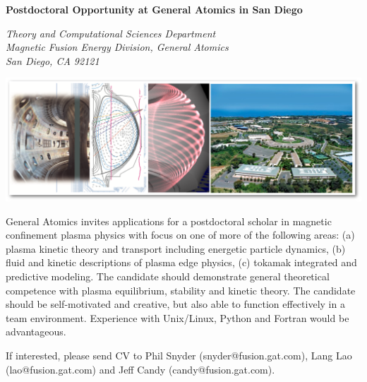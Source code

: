\documentclass[11pt,twoside]{article}
\begin{document}
\thispagestyle{empty}

\begin{center}
\textbf{\LARGE Postdoctoral Opportunity at General Atomics in San Diego} 
\end{center}

\begin{center}
  \textsl{Theory and Computational Sciences Department \\
    Magnetic Fusion Energy Division, General Atomics\\
    San Diego, CA 92121}
  \end{center}

\includegraphics[width=6.8in]{add.png}

General Atomics invites applications for a postdoctoral scholar in magnetic
confinement plasma physics with focus on one of more of the following areas:
(a) plasma kinetic theory and transport including energetic particle dynamics,
(b) fluid and kinetic descriptions of plasma edge physics,
(c) tokamak integrated and predictive modeling.
The candidate should demonstrate general theoretical competence with plasma
equilibrium, stability and kinetic theory.  The candidate should be self-motivated
and creative, but also able to function effectively in a team environment.
Experience with Unix/Linux, Python and Fortran would be advantageous.

If interested, please send CV to Phil Snyder (snyder@fusion.gat.com),
Lang Lao (lao@fusion.gat.com) and Jeff Candy (candy@fusion.gat.com).
\end{document}

